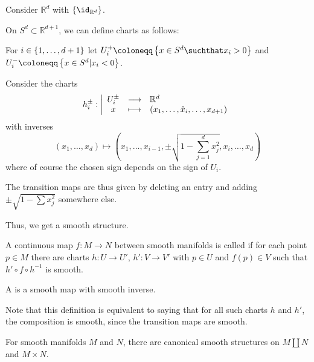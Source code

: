 \begin{example}
  Consider $\mathbb{R}^d$ with $\set{ \id_{\mathbb{R}^d} } $.
\end{example}

\begin{example}
  On $S^d \subset \mathbb{R}^{d+1}$,
  we can define charts as follows:

  For $i\in \left\{  1, \ldots, d+1  \right\}$ let
  $U_i^+ \coloneqq \set{ x\in S^d \suchthat x_i > 0 } $
  and $U_i^- \coloneqq \set{ x\in S^d | x_i < 0 }$.

  Consider the charts
  \begin{equation*}
      h_i^{\pm}: \left| \begin{array}{c c l} 
    U_i^{\pm} & \longrightarrow & \mathbb{R}^d \\
    x & \longmapsto &  (x_1, \ldots, \hat{x}_i, \ldots, x_{d+1})
    \end{array} \right.
  \end{equation*}
  with inverses
  \[
    (x_1,\dotsc, x_d)
    \mapsto
    \left(x_1, \dotsc, x_{i-1}, \pm \sqrt{1 - \sum_{j=1}^d x_j^2}, x_i, \dotsc, x_d\right)
  \]
  where of course the chosen sign depends on the sign of $U_i$.

  The transition maps are thus given by deleting an entry and
  adding $\pm \sqrt{1 - \sum x_j^2}$ somewhere else.

  Thus, we get a smooth structure.
\end{example}

\begin{definition}
  A continuous map $f\colon M\to N$
  between smooth manifolds is called 
  if for each point $p\in M$ there are charts
  $h\colon U\to U'$, $h'\colon V\to V'$
  with $p\in U$ and $f(p) \in V$
  such that $h' \circ  f \circ  h^{-1}$ is smooth.

  A  is a smooth map with smooth
  inverse.
\end{definition}

\begin{oral}
  Note that this definition is equivalent to saying
  that for all such charts $h$ and $h'$,
  the composition is smooth, since the transition maps
  are smooth.
\end{oral}

\begin{remark}
  For smooth manifolds $M$ and $N$,
  there are canonical smooth structures on $M \coprod N$
  and $M \times N$.
\end{remark}
